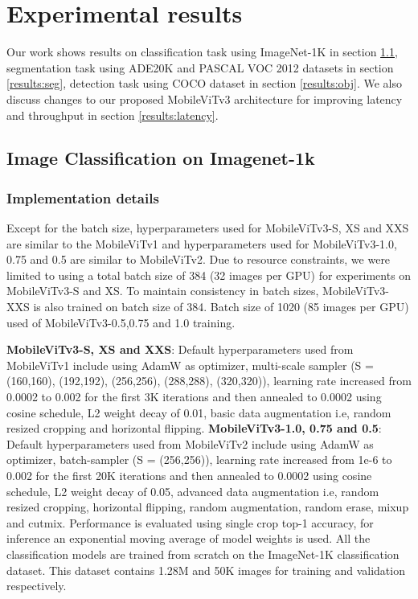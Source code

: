 \documentclass{article} \usepackage{iclr2022_conference,times}
\begin{document}
\section{Experimental results}
\label{headings}

Our work shows results on classification task using ImageNet-1K in section \ref{results:imgnet}, segmentation task using ADE20K and PASCAL VOC 2012 datasets in section \ref{results:seg}, detection task using COCO dataset in section \ref{results:obj}. 
We also discuss changes to our proposed MobileViTv3 architecture for improving latency and throughput in section \ref{results:latency}.

\subsection{Image Classification on Imagenet-1k} \label{results:imgnet}

\subsubsection{Implementation details} \label{section:classimpdetail}
Except for the batch size, hyperparameters used for MobileViTv3-S, XS and XXS are similar to the MobileViTv1 and hyperparameters used for MobileViTv3-1.0, 0.75 and 0.5 are similar to MobileViTv2. 
Due to resource constraints, we were limited to using a total batch size of 384 (32 images per GPU) for experiments on MobileViTv3-S and XS. To maintain consistency in batch sizes, MobileViTv3-XXS is also trained on batch size of 384.
Batch size of 1020 (85 images per GPU) used of MobileViTv3-0.5,0.75 and 1.0 training.


\textbf{MobileViTv3-S, XS and XXS}: 
Default hyperparameters used from MobileViTv1 include using AdamW as optimizer, multi-scale sampler (S = {(160,160), (192,192), (256,256), (288,288), (320,320)}), learning rate increased from 0.0002 to 0.002 for the first 3K iterations and then annealed to 0.0002 using cosine schedule, L2 weight decay of 0.01, basic data augmentation i.e, random resized cropping and horizontal flipping. 
\textbf{MobileViTv3-1.0, 0.75 and 0.5}: Default hyperparameters used from MobileViTv2 include using AdamW as optimizer, batch-sampler (S = {(256,256)}), learning rate increased from 1e-6 to 0.002 for the first 20K iterations and then annealed to 0.0002 using cosine schedule, L2 weight decay of 0.05, advanced data augmentation i.e, random resized cropping, horizontal flipping, random augmentation, random erase, mixup and cutmix. 
Performance is evaluated using single crop top-1 accuracy, for inference an exponential moving average of model weights is used. 
All the classification models are trained from scratch on the ImageNet-1K classification dataset. 
This dataset contains 1.28M and 50K images for training and validation respectively.
\end{document}
